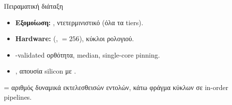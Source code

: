 \begin{frame}{Πειραματική διάταξη}
  \begin{itemize}
    \item \textbf{Εξομοίωση:} , ντετερμινιστικό \instret (όλα τα tiers).
    \item \textbf{Hardware:}  (, \VLEN${}=256$), κύκλοι ρολογιού.
    \item {}-validated ορθότητα, median, single-core pinning.
    \item {}, απουσία silicon με \Zvbc.
  \end{itemize}
  \vfill
  \begin{center}\footnotesize
    \instret = αριθμός δυναμικά εκτελεσθεισών εντολών, κάτω φράγμα κύκλων σε in-order pipelines.
  \end{center}
\end{frame}
